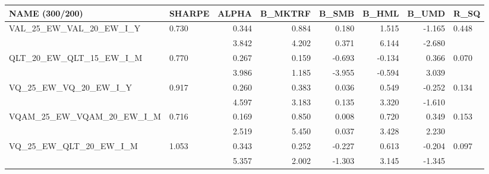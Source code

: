 \begin{tabular}{llrrrrrl}
\toprule
NAME (300/200) & SHARPE & ALPHA & B\_MKTRF & B\_SMB & B\_HML & B\_UMD & R\_SQ \\
\midrule
VAL\_25\_EW\_VAL\_20\_EW\_I\_Y & 0.730 & 0.344 & 0.884 & 0.180 & 1.515 & -1.165 & 0.448 \\
 &  & 3.842 & 4.202 & 0.371 & 6.144 & -2.680 &  \\
QLT\_20\_EW\_QLT\_15\_EW\_I\_M & 0.770 & 0.267 & 0.159 & -0.693 & -0.134 & 0.366 & 0.070 \\
 &  & 3.986 & 1.185 & -3.955 & -0.594 & 3.039 &  \\
VQ\_25\_EW\_VQ\_20\_EW\_I\_Y & 0.917 & 0.260 & 0.383 & 0.036 & 0.549 & -0.252 & 0.134 \\
 &  & 4.597 & 3.183 & 0.135 & 3.320 & -1.610 &  \\
VQAM\_25\_EW\_VQAM\_20\_EW\_I\_M & 0.716 & 0.169 & 0.850 & 0.008 & 0.720 & 0.349 & 0.153 \\
 &  & 2.519 & 5.450 & 0.037 & 3.428 & 2.230 &  \\
VQ\_25\_EW\_QLT\_20\_EW\_I\_M & 1.053 & 0.343 & 0.252 & -0.227 & 0.613 & -0.204 & 0.097 \\
 &  & 5.357 & 2.002 & -1.303 & 3.145 & -1.345 &  \\
\bottomrule
\end{tabular}
